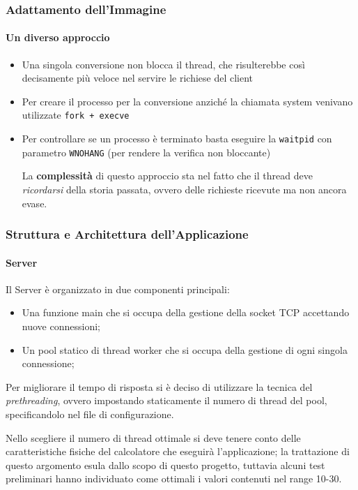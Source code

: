 \documentclass{beamer}
\begin{document}
\begin{frame}
\frametitle{Adattamento dell'Immagine}
\framesubtitle{Un diverso approccio}

\begin{itemize}
\item Una singola conversione non blocca il thread, che risulterebbe così decisamente più
veloce nel servire le richiese del client
\item Per creare il processo per la conversione anziché la chiamata system venivano
utilizzate \texttt{fork + execve}
\item Per controllare se un processo è terminato basta eseguire la \texttt{waitpid} con parametro
\texttt{WNOHANG} (per rendere la verifica non bloccante)

\medskip

La \textbf{complessità} di questo approccio sta nel fatto che il thread deve \textit{ricordarsi} della storia passata, ovvero delle richieste ricevute ma non ancora evase.
\end{itemize}
\end{frame}



\begin{frame}
\frametitle{Struttura e Architettura dell'Applicazione}
\framesubtitle{Server}

Il Server è organizzato in due componenti principali:
\begin{itemize}
\item Una funzione main che si occupa della gestione della socket TCP
accettando nuove connessioni;
\item Un pool statico di thread worker che si occupa della gestione di ogni
singola connessione;
\end{itemize}

Per migliorare il tempo di risposta si è deciso di utilizzare la tecnica del
\textit{prethreading}, ovvero impostando staticamente il numero di thread del pool,
specificandolo nel file di configurazione.

\medskip

Nello scegliere il numero di thread ottimale si deve tenere conto delle
caratteristiche fisiche del calcolatore che eseguirà l’applicazione; la trattazione di
questo argomento esula dallo scopo di questo progetto, tuttavia alcuni test
preliminari hanno individuato come ottimali i valori contenuti nel range 10-30.

\end{frame}
\end{document}
